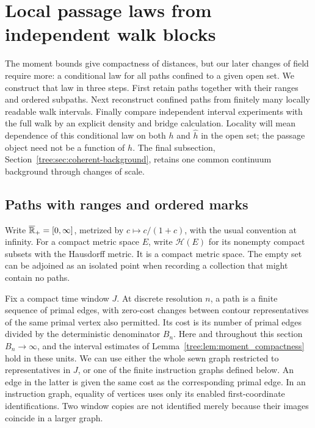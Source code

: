 \section{Local passage laws from independent walk blocks}
\label{tree:sec:certificates}

The moment bounds give compactness of distances, but our later changes
of field require more: a conditional law for all paths confined to a
given open set. We construct that law in three steps. First retain
paths together with their ranges and ordered subpaths. Next reconstruct
confined paths from finitely many locally readable walk intervals.
Finally compare independent interval experiments with the full walk by
an explicit density and bridge calculation. Locality will mean dependence
of this conditional law on both $h$ and $\widehat h$ in the open set;
the passage object need not be a function of $h$. The final subsection,
Section~\ref{tree:sec:coherent-background}, retains one common continuum
background through changes of scale.

\subsection{Paths with ranges and ordered marks}

Write $\overline{\mathbb R}_+=[0,\infty]$,
metrized by $c\mapsto c/(1+c)$, with the usual convention at infinity.  For a
compact metric space $E$, write $\mathcal H(E)$ for its nonempty compact
subsets with the Hausdorff metric.  It is a compact metric space.  The empty
set can be adjoined as an isolated point when recording a collection that
might contain no paths.

Fix a compact time window $J$. At discrete resolution $n$, a path is a finite
sequence of primal edges, with zero-cost changes between contour
representatives of the same primal vertex also permitted.  Its cost is its
number of primal edges divided by the deterministic denominator $B_n$.
Here and throughout this section $B_n\to\infty$, and the interval estimates
of Lemma~\ref{tree:lem:moment_compactness} hold in these units.  We can use either
the whole sewn graph restricted to representatives in $J$, or one of the
finite instruction graphs defined below.  An edge in the latter is given
the same cost as the corresponding primal edge.
In an instruction graph, equality of vertices uses only its enabled
first-coordinate identifications. Two window copies are not identified
merely because their images coincide in a larger graph.

